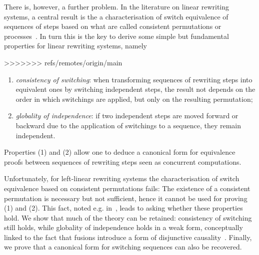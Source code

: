 \documentclass[a4paper,UKenglish,cleveref,pdftex,thm-restate,numberwithinsect,anonymous]{lipics}
\begin{document}
  


There is, however, a further problem. In the literature on linear
rewriting systems, a central result is the a characterisation of
switch equivalence of sequences of steps based on what are called
consistent permutations or processes~\cite{Handbook, tobias}.
In turn this is the key to derive some simple but fundamental properties 
for linear rewriting systems, namely

>>>>>>> refs/remotes/origin/main
\begin{enumerate}
\item \emph{consistency of switching}: when transforming
  sequences of rewriting steps into equivalent ones by switching independent steps, the
  result not depends on the order in which switchings are applied, but
  only on the resulting permutation;
\item \emph{globality of independence}: if two independent steps are
  moved forward or backward due to the application of switchings to a
  sequence, they remain independent.
\end{enumerate}
Properties (1) and (2) allow one to deduce a canonical form for equivalence proofs 
between sequences of rewriting steps seen as concurrent computations.

Unfortunately, for left-linear rewriting systems the characterisation
of switch equivalence based on consistent permutations fails: The 
existence of a consistent permutation is necessary but not
sufficient, hence it cannot be used for proving (1) and (2).
%
This fact, noted e.g. in~\cite{BaldanGM06}, leads to
asking whether these properties hold.
We show that much of the theory can be retained: consistency
of switching still holds, while globality of independence holds in a
weak form, conceptually linked to the fact that fusions introduce a
form of disjunctive causality~\cite{baldan2017domains}. Finally, 
we prove that a canonical form
for switching sequences can also be recovered.
\end{document}
